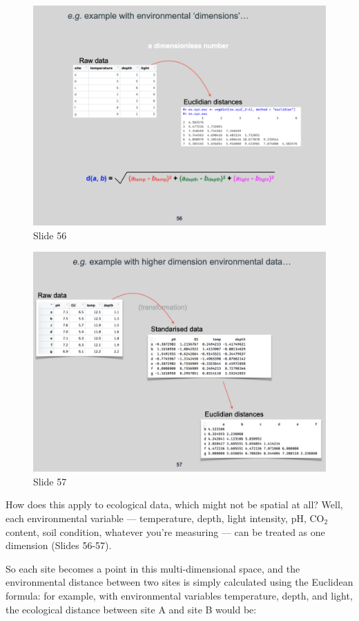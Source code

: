 \documentclass[
  11pt,
]{book}
\begin{document}
\begin{figure}[ht]
\centering
\includegraphics[width=0.8\linewidth]{../images/BDC334/BDC334-056.jpeg}
\caption*{Slide 56}
\end{figure}

\begin{figure}[ht]
\centering
\includegraphics[width=0.8\linewidth]{../images/BDC334/BDC334-057.jpeg}
\caption*{Slide 57}
\end{figure}

How does this apply to ecological data, which might not be spatial at
all? Well, each environmental variable --- temperature, depth, light
intensity, pH, CO\(_2\) content, soil condition, whatever you're
measuring --- can be treated as one dimension (Slides 56-57).

So each site becomes a point in this multi-dimensional space, and the
environmental distance between two sites is simply calculated using the
Euclidean formula: for example, with environmental variables
temperature, depth, and light, the ecological distance between site A
and site B would be:
\end{document}
